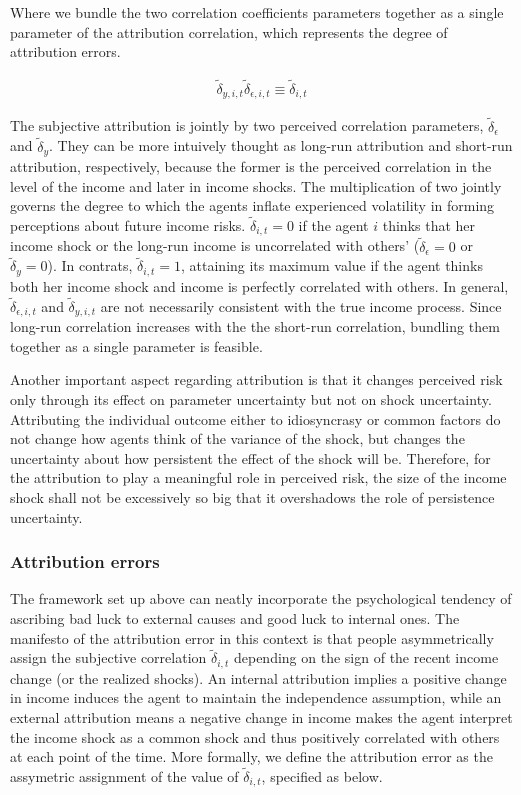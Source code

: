 \documentclass[12pt,notitlepage,onecolumn,aps,pra]{article}
\begin{document}
Where we bundle the two correlation coefficients parameters together as
a single parameter of the attribution correlation, which represents the
degree of attribution errors.

\begin{eqnarray}
\tilde \delta_{y,i,t}\tilde \delta_{\epsilon,i,t}\equiv \tilde \delta_{i,t}  
\end{eqnarray}

The subjective attribution is jointly by two perceived correlation
parameters, \(\tilde \delta_{\epsilon}\) and \(\tilde \delta_y\). They
can be more intuively thought as long-run attribution and short-run
attribution, respectively, because the former is the perceived
correlation in the level of the income and later in income shocks. The
multiplication of two jointly governs the degree to which the agents
inflate experienced volatility in forming perceptions about future
income risks. \(\tilde \delta_{i,t} = 0\) if the agent \(i\) thinks that
her income shock or the long-run income is uncorrelated with others'
(\(\tilde \delta_{\epsilon} = 0\) or \(\tilde \delta_y = 0\)). In
contrats, \(\tilde \delta_{i,t} = 1\), attaining its maximum value if
the agent thinks both her income shock and income is perfectly
correlated with others. In general, \(\tilde \delta_{\epsilon,i,t}\) and
\(\tilde \delta_{y,i,t}\) are not necessarily consistent with the true
income process. Since long-run correlation increases with the the
short-run correlation, bundling them together as a single parameter is
feasible.

Another important aspect regarding attribution is that it changes
perceived risk only through its effect on parameter uncertainty but not
on shock uncertainty. Attributing the individual outcome either to
idiosyncrasy or common factors do not change how agents think of the
variance of the shock, but changes the uncertainty about how persistent
the effect of the shock will be. Therefore, for the attribution to play
a meaningful role in perceived risk, the size of the income shock shall
not be excessively so big that it overshadows the role of persistence
uncertainty.


    \hypertarget{attribution-errors}{%
\subsubsection{Attribution errors}\label{attribution-errors}}

The framework set up above can neatly incorporate the psychological
tendency of ascribing bad luck to external causes and good luck to
internal ones. The manifesto of the attribution error in this context is
that people asymmetrically assign the subjective correlation
\(\tilde \delta_{i,t}\) depending on the sign of the recent income
change (or the realized shocks). An internal attribution implies a
positive change in income induces the agent to maintain the independence
assumption, while an external attribution means a negative change in
income makes the agent interpret the income shock as a common shock and
thus positively correlated with others at each point of the time. More
formally, we define the attribution error as the assymetric assignment
of the value of \(\tilde\delta_{i,t}\), specified as below.
\end{document}
